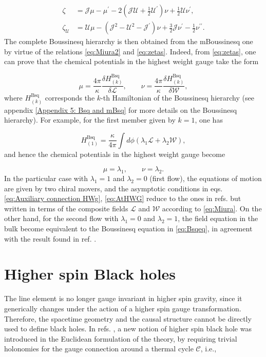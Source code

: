 \documentclass[letterpaper,11pt,oneside]{book}
\begin{document}
\begin{align}
	\zeta & =\mathcal{J}\mu-\mu^{\prime}-2\left(\mathcal{J}\mathcal{U}+\frac{1}{2}\mathcal{U}^{\prime}\right)\nu+\frac{1}{2}\mathcal{U}\nu^{\prime},\nonumber \\
	\zeta_{\mathcal{U}} & =\mathcal{U}\mu-\left(\mathcal{J}^{2}-\mathcal{U}^{2}-\mathcal{J}^{\prime}\right)\nu+\frac{3}{2}\mathcal{J}\nu^{\prime}-\frac{1}{2}\nu^{\prime\prime}.\label{eq:zetas}
\end{align}
The complete Boussinesq hierarchy is then obtained from the mBoussinesq
one by virtue of the relations \eqref{eq:Miura2} and \eqref{eq:zetas}.
Indeed, from \eqref{eq:zetas}, one can prove that the chemical potentials
in the highest weight gauge take the form

\[
\mu=\frac{4\pi}{\kappa}\frac{\delta H_{\left(k\right)}^{\text{Bsq}}}{\delta\mathcal{L}},\quad\quad\nu=\frac{4\pi}{\kappa}\frac{\delta H_{\left(k\right)}^{\text{Bsq}}}{\delta\mathcal{W}},
\]
where $H_{\left(k\right)}^{\text{Bsq}}$ corresponds the $k$-th Hamiltonian
of the Boussinesq hierarchy (see appendix \ref{Appendix 5: Bsq and mBsq}
for more details on the Boussinesq hierarchy). For example, for the
first member given by $k=1$, one has

\[
H_{\left(1\right)}^{\text{Bsq}}=\frac{\kappa}{4\pi}\int d\phi\left(\lambda_{1}\mathcal{L}+\lambda_{2}\mathcal{W}\right),
\]
and hence the chemical potentials in the highest weight gauge become

\[
\mu=\lambda_{1},\quad\quad\nu=\lambda_{2}.
\]
In the particular case with $\lambda_{1}=1$ and $\lambda_{2}=0$
(first flow), the equations of motion are given by two chiral movers,
and the asymptotic conditions in eqs. \eqref{eq:Auxiliary connection HWg},
\eqref{eq:AtHWG} reduce to the ones in refs. \cite{Campoleoni:2010zq,Henneaux:2010xg}
but written in terms of the composite fields $\mathcal{L}$ and $\mathcal{W}$
according to \eqref{eq:Miura}. On the other hand, for the second
flow with $\lambda_{1}=0$ and $\lambda_{2}=1$, the field equation
in the bulk become equivalent to the Boussinesq equation in \eqref{eq:Bsqeq},
in agreement with the result found in ref. \cite{Perez:2016vqo}.

\section{Higher spin Black holes\label{sec:3 Black holes}}

The line element is no longer gauge invariant in higher spin gravity,
since it generically changes under the action of a higher spin gauge
transformation. Therefore, the spacetime geometry and the causal structure
cannot be directly used to define black holes. In refs. \cite{Gutperle:2011kf,Ammon:2011nk},
a new notion of higher spin black hole was introduced in the Euclidean
formulation of the theory, by requiring trivial holonomies for the
gauge connection around a thermal cycle $\mathcal{C}$, i.e.,
\end{document}
